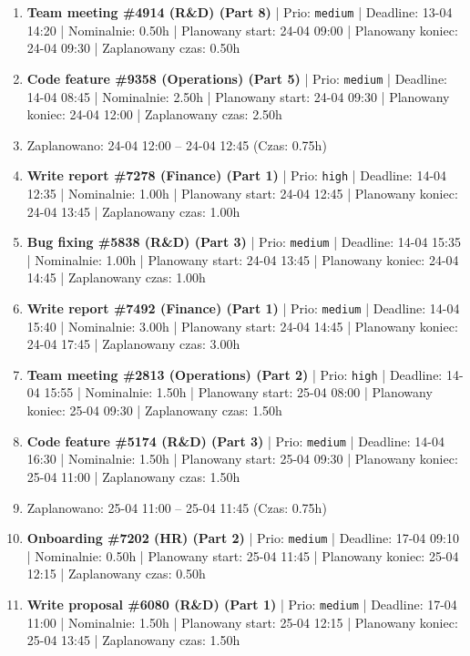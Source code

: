 {\begin{enumerate}
  \item [\textbf{14638}] \textbf{Team meeting \#4914 (R\&D) (Part 8)} | Prio: \texttt{medium} | Deadline: 13-04 14:20 | Nominalnie: 0.50h | Planowany start: 24-04 09:00 | Planowany koniec: 24-04 09:30 | Zaplanowany czas: 0.50h
  \item [\textbf{14661}] \textbf{Code feature \#9358 (Operations) (Part 5)} | Prio: \texttt{medium} | Deadline: 14-04 08:45 | Nominalnie: 2.50h | Planowany start: 24-04 09:30 | Planowany koniec: 24-04 12:00 | Zaplanowany czas: 2.50h
  \item [\textbf{PRZERWA}] Zaplanowano: 24-04 12:00 -- 24-04 12:45 (Czas: 0.75h)
  \item [\textbf{14609}] \textbf{Write report \#7278 (Finance) (Part 1)} | Prio: \texttt{high} | Deadline: 14-04 12:35 | Nominalnie: 1.00h | Planowany start: 24-04 12:45 | Planowany koniec: 24-04 13:45 | Zaplanowany czas: 1.00h
  \item [\textbf{14637}] \textbf{Bug fixing \#5838 (R\&D) (Part 3)} | Prio: \texttt{medium} | Deadline: 14-04 15:35 | Nominalnie: 1.00h | Planowany start: 24-04 13:45 | Planowany koniec: 24-04 14:45 | Zaplanowany czas: 1.00h
  \item [\textbf{14642}] \textbf{Write report \#7492 (Finance) (Part 1)} | Prio: \texttt{medium} | Deadline: 14-04 15:40 | Nominalnie: 3.00h | Planowany start: 24-04 14:45 | Planowany koniec: 24-04 17:45 | Zaplanowany czas: 3.00h
  \item [\textbf{14617}] \textbf{Team meeting \#2813 (Operations) (Part 2)} | Prio: \texttt{high} | Deadline: 14-04 15:55 | Nominalnie: 1.50h | Planowany start: 25-04 08:00 | Planowany koniec: 25-04 09:30 | Zaplanowany czas: 1.50h
  \item [\textbf{14646}] \textbf{Code feature \#5174 (R\&D) (Part 3)} | Prio: \texttt{medium} | Deadline: 14-04 16:30 | Nominalnie: 1.50h | Planowany start: 25-04 09:30 | Planowany koniec: 25-04 11:00 | Zaplanowany czas: 1.50h
  \item [\textbf{PRZERWA}] Zaplanowano: 25-04 11:00 -- 25-04 11:45 (Czas: 0.75h)
  \item [\textbf{14648}] \textbf{Onboarding \#7202 (HR) (Part 2)} | Prio: \texttt{medium} | Deadline: 17-04 09:10 | Nominalnie: 0.50h | Planowany start: 25-04 11:45 | Planowany koniec: 25-04 12:15 | Zaplanowany czas: 0.50h
  \item [\textbf{14669}] \textbf{Write proposal \#6080 (R\&D) (Part 1)} | Prio: \texttt{medium} | Deadline: 17-04 11:00 | Nominalnie: 1.50h | Planowany start: 25-04 12:15 | Planowany koniec: 25-04 13:45 | Zaplanowany czas: 1.50h

\end{enumerate}}
